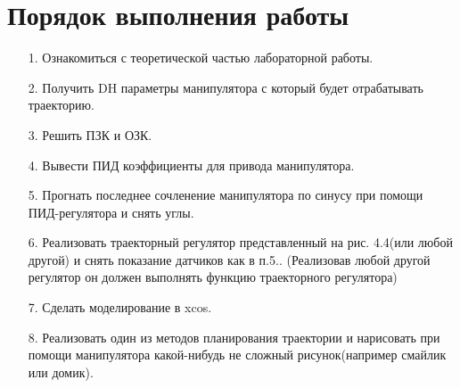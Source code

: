 \section{Порядок выполнения работы\\}

\begin{enumerate} 
\item[1.] Ознакомиться с теоретической частью лабораторной работы.
\item[2.] Получить DH параметры манипулятора с который будет отрабатывать траекторию.
\item[3.] Решить ПЗК и ОЗК.
\item[4.] Вывести ПИД коэффициенты для привода манипулятора.
\item[5.] Прогнать последнее сочленение манипулятора по синусу при помощи ПИД-регулятора и снять углы.
\item[6.] Реализовать траекторный регулятор представленный на рис. 4.4(или любой другой) и снять показание датчиков как в п.5..
(Реализовав любой другой регулятор он должен выполнять функцию траекторного регулятора)
\item[7.] Сделать моделирование в xcos.
\item[8.] Реализовать один из методов планирования траектории и нарисовать при помощи манипулятора какой-нибудь не сложный рисунок(например смайлик или домик).
 \end{enumerate}
 